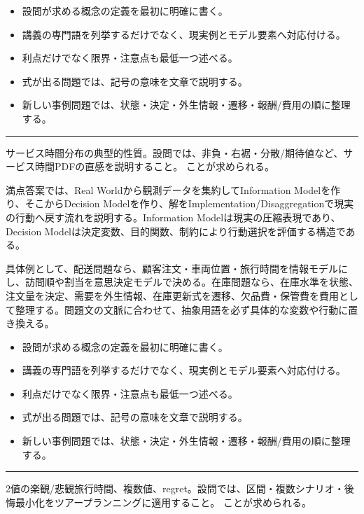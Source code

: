 \begin{itemize}
\item 設問が求める概念の定義を最初に明確に書く。
\item 講義の専門語を列挙するだけでなく、現実例とモデル要素へ対応付ける。
\item 利点だけでなく限界・注意点も最低一つ述べる。
\item 式が出る問題では、記号の意味を文章で説明する。
\item 新しい事例問題では、状態・決定・外生情報・遷移・報酬/費用の順に整理する。
\end{itemize}
\vspace{2mm}\hrule\vspace{2mm}
サービス時間分布の典型的性質。設問では、非負・右裾・分散/期待値など、サービス時間PDFの直感を説明すること。 ことが求められる。\par
{}
満点答案では、Real Worldから観測データを集約してInformation Modelを作り、そこからDecision Modelを作り、解をImplementation/Disaggregationで現実の行動へ戻す流れを説明する。Information Modelは現実の圧縮表現であり、Decision Modelは決定変数、目的関数、制約により行動選択を評価する構造である。\par
{}
具体例として、配送問題なら、顧客注文・車両位置・旅行時間を情報モデルにし、訪問順や割当を意思決定モデルで決める。在庫問題なら、在庫水準を状態、注文量を決定、需要を外生情報、在庫更新式を遷移、欠品費・保管費を費用として整理する。問題文の文脈に合わせて、抽象用語を必ず具体的な変数や行動に置き換える。\par
{}
\begin{itemize}
\item 設問が求める概念の定義を最初に明確に書く。
\item 講義の専門語を列挙するだけでなく、現実例とモデル要素へ対応付ける。
\item 利点だけでなく限界・注意点も最低一つ述べる。
\item 式が出る問題では、記号の意味を文章で説明する。
\item 新しい事例問題では、状態・決定・外生情報・遷移・報酬/費用の順に整理する。
\end{itemize}
\vspace{2mm}\hrule\vspace{2mm}
2値の楽観/悲観旅行時間、複数値、regret。設問では、区間・複数シナリオ・後悔最小化をツアープランニングに適用すること。 ことが求められる。\par

